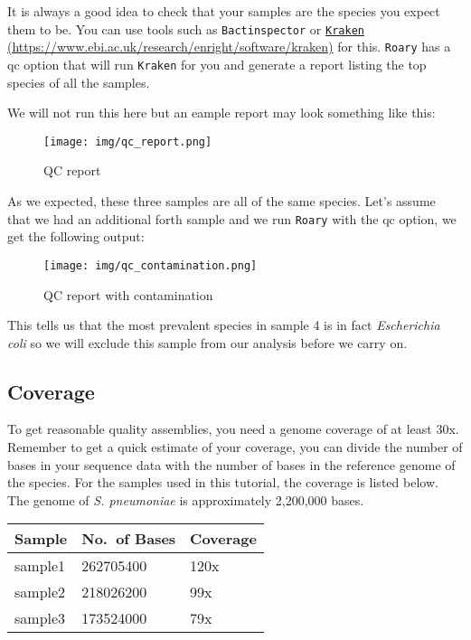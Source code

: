 \documentclass[11pt]{article}
\begin{document}
It is always a good idea to check that your samples are the species you
expect them to be. You can use tools such as \texttt{Bactinspector} or
\href{https://www.ebi.ac.uk/research/enright/software/kraken}{\texttt{Kraken}
(https://www.ebi.ac.uk/research/enright/software/kraken)} for this.
\texttt{Roary} has a qc option that will run \texttt{Kraken} for you and
generate a report listing the top species of all the samples.

We will not run this here but an eample report may look something like
this:

    \begin{figure}
\centering
\texttt{[image: img/qc\_report.png]}
\caption{QC report}
\end{figure}

    As we expected, these three samples are all of the same species. Let's
assume that we had an additional forth sample and we run \texttt{Roary}
with the qc option, we get the following output:

    \begin{figure}
\centering
\texttt{[image: img/qc\_contamination.png]}
\caption{QC report with contamination}
\end{figure}

    This tells us that the most prevalent species in sample 4 is in fact
\textit{Escherichia coli} so we will exclude this sample from our analysis
before we carry on.

\hypertarget{coverage}{%
\subsection{Coverage}\label{coverage}}

To get reasonable quality assemblies, you need a genome coverage of at
least 30x. Remember to get a quick estimate of your coverage, you can
divide the number of bases in your sequence data with the number of
bases in the reference genome of the species. For the samples used in
this tutorial, the coverage is listed below. The genome of \textit{S.
pneumoniae} is approximately 2,200,000 bases.

\begin{longtable}[]{@{}lll@{}}
\toprule
Sample & No.~of Bases & Coverage \\
\midrule
\endhead
sample1 & 262705400 & 120x \\
sample2 & 218026200 & 99x \\
sample3 & 173524000 & 79x \\
\bottomrule
\end{longtable}
\end{document}
